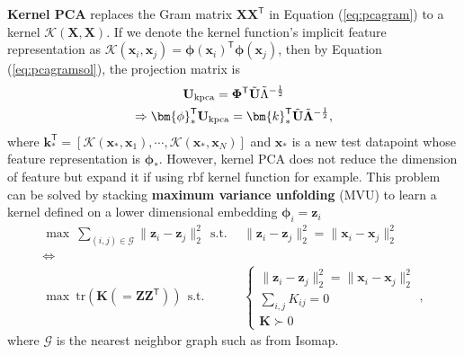 \textbf{Kernel PCA} replaces the Gram matrix $\mathbf{XX}^\mathsf{T}$ in Equation (\ref{eq:pcagram}) to a kernel $\mathcal{K}(\mathbf{X},\mathbf{X})$.
If we denote the kernel function's implicit feature representation as $\mathcal{K}(\bm{x}_i,\bm{x}_j)=\bm{\phi}(\bm{x}_i)^\mathsf{T}\bm{\phi}(\bm{x}_j)$,
then by Equation (\ref{eq:pcagramsol}), the projection matrix is 
\begin{gather}
    \mathbf{U}_\text{kpca} = \mathbf{\Phi}^\mathsf{T}\Tilde{\mathbf{U}}\Tilde{\Lambda}^{-\frac{1}{2}} \\
    \Rightarrow \bm{\phi}_*^\mathsf{T}\mathbf{U}_\text{kpca} = \bm{k}_*^\mathsf{T}\Tilde{\mathbf{U}}\Tilde{\mathbf{\Lambda}}^{-\frac{1}{2}},
\end{gather}
where $\bm{k}_*^\mathsf{T} = [\mathcal{K}(\bm{x}_*,\bm{x}_1),\cdots,\mathcal{K}(\bm{x}_*,\bm{x}_N)]$ and 
$\bm{x}_*$ is a new test datapoint whose feature representation is $\bm{\phi}_*$.
However, kernel PCA does not reduce the dimension of feature but expand it if using rbf kernel function for example.
This problem can be solved by stacking \textbf{maximum variance unfolding} (MVU) to learn a kernel defined on a lower dimensional embedding $\bm{\phi}_i=\bm{z}_i$
\begin{align}
    \max~\sum_{(i,j)\in\mathcal{G}}\|\bm{z}_i-\bm{z}_j\|^2_2~~\text{s.t.}&~~\|\bm{z}_i-\bm{z}_j\|_2^2 = \|\bm{x}_i-\bm{x}_j\|_2^2 \\
    \iff& \\
    \max~\mathrm{tr}(\mathbf{K}(=\mathbf{ZZ}^\mathsf{T}))~~\text{s.t.}&~~\begin{cases}
        \|\bm{z}_i-\bm{z}_j\|_2^2 = \|\bm{x}_i-\bm{x}_j\|_2^2 \\
        \sum_{i,j} K_{ij} = 0 \\
        \mathbf{K} \succ 0
    \end{cases},
\end{align}
where $\mathcal{G}$ is the nearest neighbor graph such as from Isomap.


